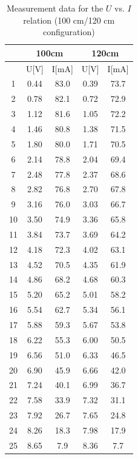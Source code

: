 \documentclass[12pt]{article}
\begin{document}
\begin{table}[H]
\centering
\begin{tabular}{|c|c|c|c|c|}
\hline
   & \multicolumn{2}{c|}{100cm} & \multicolumn{2}{c|}{120cm} \\ \hline
   & U[V]        & I[mA]        & U[V]        & I[mA]        \\ \hline
1  & 0.44        & 83.0         & 0.39        & 73.7         \\ \hline
2  & 0.78        & 82.1         & 0.72        & 72.9         \\ \hline
3  & 1.12        & 81.6         & 1.05        & 72.2         \\ \hline
4  & 1.46        & 80.8         & 1.38        & 71.5         \\ \hline
5  & 1.80        & 80.0         & 1.71        & 70.5         \\ \hline
6  & 2.14        & 78.8         & 2.04        & 69.4         \\ \hline
7  & 2.48        & 77.8         & 2.37        & 68.6         \\ \hline
8  & 2.82        & 76.8         & 2.70        & 67.8         \\ \hline
9  & 3.16        & 76.0         & 3.03        & 66.7         \\ \hline
10 & 3.50        & 74.9         & 3.36        & 65.8         \\ \hline
11 & 3.84        & 73.7         & 3.69        & 64.2         \\ \hline
12 & 4.18        & 72.3         & 4.02        & 63.1         \\ \hline
13 & 4.52        & 70.5         & 4.35        & 61.9         \\ \hline
14 & 4.86        & 68.2         & 4.68        & 60.3         \\ \hline
15 & 5.20        & 65.2         & 5.01        & 58.2         \\ \hline
16 & 5.54        & 62.7         & 5.34        & 56.1         \\ \hline
17 & 5.88        & 59.3         & 5.67        & 53.8         \\ \hline
18 & 6.22        & 55.3         & 6.00        & 50.5         \\ \hline
19 & 6.56        & 51.0         & 6.33        & 46.5         \\ \hline
20 & 6.90        & 45.9         & 6.66        & 42.0         \\ \hline
21 & 7.24        & 40.1         & 6.99        & 36.7         \\ \hline
22 & 7.58        & 33.9         & 7.32        & 31.1         \\ \hline
23 & 7.92        & 26.7         & 7.65        & 24.8         \\ \hline
24 & 8.26        & 18.3         & 7.98        & 17.9         \\ \hline
25 & 8.65        & 7.9          & 8.36        & 7.7          \\ \hline
\end{tabular}
\caption{Measurement data for the $U$ vs. $I$ relation (100 cm/120 cm configuration)}
\end{table}
\end{document}
